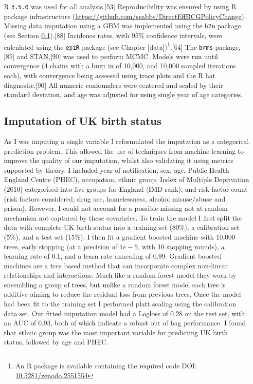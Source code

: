 \documentclass[11pt,twoside]{bristolthesis}
\begin{document}
  R \texttt{3.5.0} was used for all analysis.{[}53{]} Reproducibility was ensured by using R package infrastructure (\url{https://github.com/seabbs/DirectEffBCGPolicyChange}). Missing data imputation using a GBM was implemented using the \texttt{h2o} package (see Section \ref{imp-uk-birth-status}).{[}88{]} Incidence rates, with 95\% confidence intervals, were calculated using the \texttt{epiR} package (see Chapter \ref{data})\footnote{An R package is available containing the required code DOI: \href{https://zenodo.org/badge/latestdoi/93072437}{10.5281/zenodo.2551554}}.{[}64{]} The \texttt{brms} package,{[}89{]} and STAN,{[}90{]} was used to perform MCMC. Models were run until convergence (4 chains with a burn in of 10,000, and 10,000 sampled iterations each), with convergence being assessed using trace plots and the R hat diagnostic.{[}90{]} All numeric confounders were centered and scaled by their standard deviation, and age was adjusted for using single year of age categories.
  
  \hypertarget{imp-uk-birth-status}{%
  \subsection{Imputation of UK birth status}\label{imp-uk-birth-status}}
  
  As I was imputing a single variable I reformulated the imputation as a categorical prediction problem. This allowed the use of techniques from machine learning to improve the quality of our imputation, whilst also validating it using metrics supported by theory. I included year of notification, sex, age, Public Health England Centre (PHEC), occupation, ethnic group, Index of Multiple Deprivation (2010) categorised into five groups for England (IMD rank), and risk factor count (risk factors considered; drug use, homelessness, alcohol misuse/abuse and prison). However, I could not account for a possible missing not at random mechanism not captured by these covariates. To train the model I first split the data with complete UK birth status into a training set (80\%), a calibration set (5\%), and a test set (15\%). I then fit a gradient boosted machine with 10,000 trees, early stopping (at a precision of \(1e-5\), with 10 stopping rounds), a learning rate of 0.1, and a learn rate annealing of 0.99. Gradient boosted machines are a tree based method that can incorporate complex non-linear relationships and interactions. Much like a random forest model they work by ensembling a group of trees, but unlike a random forest model each tree is additive aiming to reduce the residual loss from previous trees. Once the model had been fit to the training set I performed platt scaling using the calibration data set. Our fitted imputation model had a Logloss of 0.28 on the test set, with an AUC of 0.93, both of which indicate a robust out of bag performance. I found that ethnic group was the most important variable for predicting UK birth status, followed by age and PHEC.
  
\end{document}
